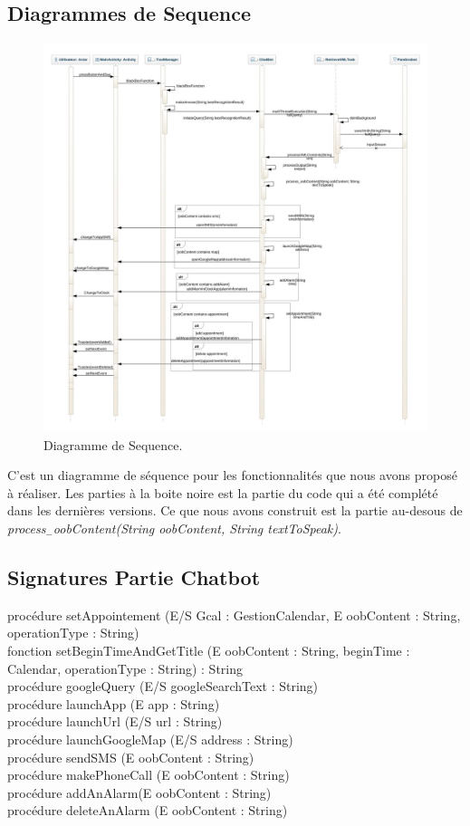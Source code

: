 \subsection{Diagrammes de Sequence}
\begin{figure}[h]
\centering
\includegraphics[scale=0.447]{./diagrammes/SequenceDiagram.jpeg}
\caption{Diagramme de Sequence.\label{fig3}}
\end{figure}
\indent C'est un diagramme de séquence pour les fonctionnalités que nous avons proposé à réaliser. Les parties à la boite noire est la partie du code qui a été complété dans les dernières versions. Ce que nous avons construit est la partie au-desous de \emph{process$_-$oobContent(String oobContent, String textToSpeak)}.
\newpage
\newpage


\subsection{Signatures Partie Chatbot}
procédure setAppointement (E/S Gcal : GestionCalendar, E oobContent : String, operationType : String)\\
\indent fonction setBeginTimeAndGetTitle (E oobContent : String, beginTime : Calendar, operationType : String) : String\\
\indent procédure googleQuery (E/S googleSearchText : String)\\
\indent procédure launchApp (E app : String)\\
\indent procédure launchUrl (E/S url : String)\\
\indent procédure launchGoogleMap (E/S address : String)\\
\indent procédure sendSMS (E oobContent : String)\\
\indent procédure makePhoneCall (E oobContent : String)\\
\indent procédure addAnAlarm(E oobContent : String)\\
\indent procédure deleteAnAlarm (E oobContent : String)\\

